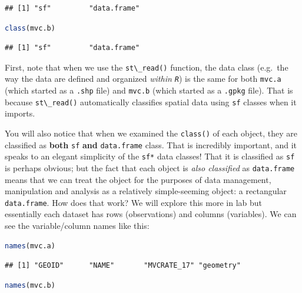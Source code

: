 \documentclass[
]{book}
\newcommand{\passthrough}[1]{#1}
\begin{document}
\begin{lstlisting}
## [1] "sf"         "data.frame"
\end{lstlisting}

\begin{lstlisting}[language=R]
class(mvc.b)
\end{lstlisting}

\begin{lstlisting}
## [1] "sf"         "data.frame"
\end{lstlisting}

First, note that when we use the \passthrough{\lstinline!st\_read()!} function, the data class (e.g.~the way the data are defined and organized \emph{within \passthrough{\lstinline!R!}}) is the same for both \passthrough{\lstinline!mvc.a!} (which started as a \passthrough{\lstinline!.shp!} file) and \passthrough{\lstinline!mvc.b!} (which started as a \passthrough{\lstinline!.gpkg!} file). That is because \passthrough{\lstinline!st\_read()!} automatically classifies spatial data using \passthrough{\lstinline!sf!} classes when it imports.

You will also notice that when we examined the \passthrough{\lstinline!class()!} of each object, they are classified as \textbf{both} \passthrough{\lstinline!sf!} \textbf{and} \passthrough{\lstinline!data.frame!} class. That is incredibly important, and it speaks to an elegant simplicity of the \passthrough{\lstinline!sf*!} data classes! That it is classified as \passthrough{\lstinline!sf!} is perhaps obvious; but the fact that each object is \emph{also classified} as \passthrough{\lstinline!data.frame!} means that we can treat the object for the purposes of data management, manipulation and analysis as a relatively simple-seeming object: a rectangular \passthrough{\lstinline!data.frame!}. How does that work? We will explore this more in lab but essentially each dataset has rows (observations) and columns (variables). We can see the variable/column names like this:

\begin{lstlisting}[language=R]
names(mvc.a)
\end{lstlisting}

\begin{lstlisting}
## [1] "GEOID"      "NAME"       "MVCRATE_17" "geometry"
\end{lstlisting}

\begin{lstlisting}[language=R]
names(mvc.b)
\end{lstlisting}
\end{document}

